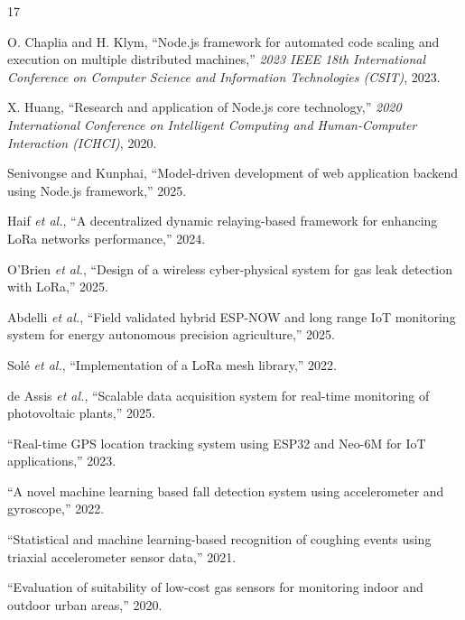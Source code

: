 \documentclass[conference]{IEEEtran}
\begin{document}
	\begin{thebibliography}{17}
		
		O. Chaplia and H. Klym, ``Node.js framework for automated code scaling and
		execution on multiple distributed machines,'' \textit{2023 IEEE 18th
			International Conference on Computer Science and Information Technologies
			(CSIT)}, 2023.
		
		X. Huang, ``Research and application of Node.js core technology,''
		\textit{2020 International Conference on Intelligent Computing and
			Human-Computer Interaction (ICHCI)}, 2020.
		
		Senivongse and Kunphai, ``Model-driven development of web application backend
		using Node.js framework,'' 2025.
		
		Haif \textit{et al.}, ``A decentralized dynamic relaying-based framework for
		enhancing LoRa networks performance,'' 2024.
		
		O'Brien \textit{et al.}, ``Design of a wireless cyber-physical system for gas
		leak detection with LoRa,'' 2025.
		
		Abdelli \textit{et al.}, ``Field validated hybrid ESP-NOW and long range IoT
		monitoring system for energy autonomous precision agriculture,'' 2025.
		
		Sol\'{e} \textit{et al.}, ``Implementation of a LoRa mesh library,'' 2022.
		
		de Assis \textit{et al.}, ``Scalable data acquisition system for real-time
		monitoring of photovoltaic plants,'' 2025.
		
		``Real-time GPS location tracking system using ESP32 and Neo-6M for IoT
		applications,'' 2023.
		
		``A novel machine learning based fall detection system using accelerometer and
		gyroscope,'' 2022.
		
		``Statistical and machine learning-based recognition of coughing events using
		triaxial accelerometer sensor data,'' 2021.
		
		``Evaluation of suitability of low-cost gas sensors for monitoring indoor and
		outdoor urban areas,'' 2020.
		

\end{thebibliography}
\end{document}
